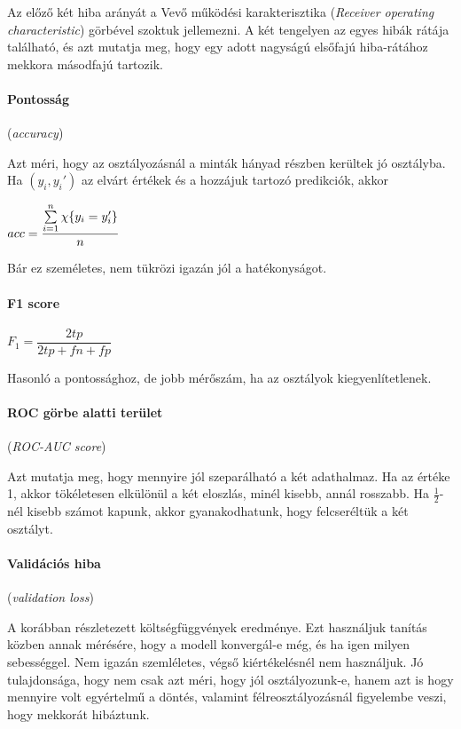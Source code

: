 Az előző két hiba arányát a Vevő működési karakterisztika 
(\textit{Receiver operating characteristic}) 
görbével szoktuk jellemezni. A két tengelyen az egyes hibák 
rátája található, és azt mutatja meg, hogy egy adott nagyságú elsőfajú 
hiba-rátához mekkora másodfajú tartozik.



\paragraph{Pontosság} (\textit{accuracy})

Azt méri, hogy az osztályozásnál a minták hányad részben
kerültek jó osztályba.
Ha $ (y_i, y_i') $ az elvárt értékek és a hozzájuk tartozó 
predikciók, akkor

$ acc = \dfrac{\sum\limits_{{i}=1}^{n} \chi\{y_i = y_i'\}}{n} $ 

Bár ez személetes, nem tükrözi igazán jól a hatékonyságot.


\paragraph{F1 score} \mbox{} 


$ F_1 = \dfrac{2tp}{2tp + fn + fp} $

\noindent
Hasonló a pontossághoz, de jobb mérőszám, ha az osztályok kiegyenlítetlenek.



\paragraph{ROC görbe alatti terület} (\textit{ROC-AUC score})

Azt mutatja meg, hogy mennyire jól szeparálható a két adathalmaz. 
Ha az értéke 1, akkor tökéletesen elkülönül a két eloszlás, 
minél kisebb, annál rosszabb. Ha $ \frac{1}{2} $-nél kisebb számot kapunk,
akkor gyanakodhatunk, hogy felcseréltük a két osztályt.

\paragraph{Validációs hiba} (\textit{validation loss})

A korábban részletezett költségfüggvények eredménye. Ezt használjuk
tanítás közben annak mérésére, hogy a modell konvergál-e még,
és ha igen milyen sebességgel. Nem igazán szemléletes, végső kiértékelésnél
nem használjuk. Jó tulajdonsága, hogy nem csak azt méri, hogy jól
osztályozunk-e, hanem azt is hogy mennyire volt egyértelmű a döntés,
valamint félreosztályozásnál figyelembe veszi, hogy mekkorát hibáztunk.



